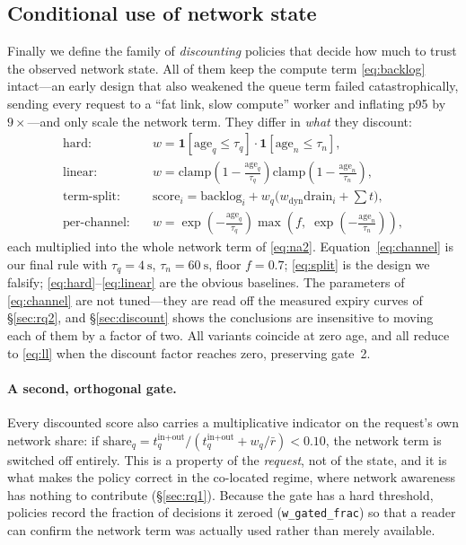 \subsection{Conditional use of network state}
\label{sec:policy:adaptive}
Finally we define the family of \emph{discounting} policies that decide how much to trust the
observed network state. All of them keep the compute term \eqref{eq:backlog} intact---an early
design that also weakened the queue term failed catastrophically, sending every request to a
``fat link, slow compute'' worker and inflating p95 by $9\times$---and only scale the network
term. They differ in \emph{what} they discount:
\begin{align}
  \text{hard:} \quad & w = \mathbf{1}[\text{age}_q \le \tau_q]\cdot\mathbf{1}[\text{age}_n \le \tau_n], \label{eq:hard}\\
  \text{linear:} \quad & w = \mathrm{clamp}\!\left(1-\tfrac{\text{age}_q}{\tau_q}\right)\mathrm{clamp}\!\left(1-\tfrac{\text{age}_n}{\tau_n}\right), \label{eq:linear}\\
  \text{term-split:} \quad & \text{score}_i = \text{backlog}_i + w_q\big(w_{\text{dyn}}\text{drain}_i + \textstyle\sum t\big), \label{eq:split}\\
  \text{per-channel:} \quad & w = \exp\!\left(-\tfrac{\text{age}_q}{\tau_q}\right)\max\!\left(f,\; \exp\!\left(-\tfrac{\text{age}_n}{\tau_n}\right)\right), \label{eq:channel}
\end{align}
each multiplied into the whole network term of \eqref{eq:na2}. Equation~\eqref{eq:channel} is
our final rule with $\tau_q = \SI{4}{\second}$, $\tau_n = \SI{60}{\second}$, floor $f = 0.7$;
\eqref{eq:split} is the design we falsify; \eqref{eq:hard}--\eqref{eq:linear} are the obvious
baselines. The parameters of \eqref{eq:channel} are not tuned---they are read off the measured
expiry curves of \S\ref{sec:rq2}, and \S\ref{sec:discount} shows the conclusions are insensitive
to moving each of them by a factor of two. All variants coincide at zero age, and all reduce to
\eqref{eq:ll} when the discount factor reaches zero, preserving gate~2.

\paragraph{A second, orthogonal gate.}
Every discounted score also carries a multiplicative indicator on the request's own network
share: if $\text{share}_q = t^{\text{in}+\text{out}}_q /
(t^{\text{in}+\text{out}}_q + w_q/\bar r) < 0.10$, the network term is switched off entirely.
This is a property of the \emph{request}, not of the state, and it is what makes the policy
correct in the co-located regime, where network awareness has nothing to contribute
(\S\ref{sec:rq1}). Because the gate has a hard threshold, policies record the fraction of
decisions it zeroed (\texttt{w\_gated\_frac}) so that a reader can confirm the network term was
actually used rather than merely available.
